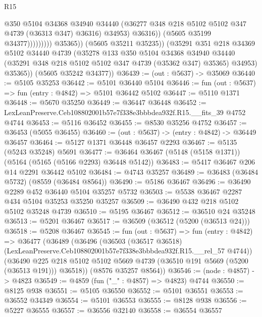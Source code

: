 \begin{lexlean}{R15}
\begin{coremodule}
{{{{{{{{{{{                                    @350
                                    @5104
                                    @34368
                                    @34940
                                    @34440
                                    (@36277 @348 @218 @5102 @5102 @347 @4739 (@36313 @347) @36316)
                                    @34953)
                                  @36316))
                              (@5605 @35199 @34377)))))))))
              @35365))
          (@5605 @35211 @35235))
        (@35291
          @351
          @218
          @34369
          @5102
          @34440
          @4739
          (@35278
            @133
            @350
            @5104
            @34368
            @34940
            @34440
            (@35291 @348 @218 @5102 @5102 @347 @4739 (@35362 @347) @35365)
            @34953)
          @35365))
      (@5605 @35242 @34377))
@36439 := (out : @5637) -> @35069
@36440 := @5105 @35253
@36442 := @5101 @36440 @5104
@36446 := fun (out : @5637) => fun (entry : @4842) => @5101 @36442 @5102
@36447 := @5110 @1371
@36448 := @5670 @35250
@36449 := @36447 @36448
@36452 := LexLeanPreserve.Ceb108802001b57e7f338e3bbbdea932f.R15.__fits_39 @4752 @4744
@36453 := @5116 @36452
@36455 := @8530 @35256 @4752
@36457 := @36453 (@5055 @36455)
@36460 := (out : @5637) -> (entry : @4842) -> @36449 @36457
@36464 := @5127 @1371 @36448 @36457 @2293
@36467 := @5135 (@5243 @35248) @5691
@36477 := @36464 @36467 (@5148 (@5158 @1371)) (@5164 (@5165 (@5166 @2293) @36448 @5142))
@36483 := @5417 @36467 @206 @14 @2291 @36442 @5102
@36484 := @4743 @35257
@36489 := @36483 (@36484 @5732) (@8559 (@36484 @8564))
@36490 := @5186 @36467
@36496 := @36490 @2289 @452 @36440 @5104 @35257 @5732
@36503 := @5538 @36467 @2287 @434 @5104 @35253 @35250 @35257
@36509 := @36490 @432 @218 @5102 @5102 @35248 @4739
@36510 := @5195 @36467
@36512 := @36510 @24 @35248
@36513 := @5201 @36467
@36517 := @36509 (@36512 (@5200 (@36513 @24)))
@36518 := @5208 @36467
@36545 := fun (out : @5637) =>
  fun (entry : @4842) =>
  @36477
    (@36489
      (@36496
        (@36503
          (@36517 @36518)
          (LexLeanPreserve.Ceb108802001b57e7f338e3bbbdea932f.R15.__rel_57 @4744))
        (@36490 @225 @218 @5102 @5102 @5669 @4739 (@36510 @191 @5669 (@5200 (@36513 @191))) @36518))
      (@8576 @35257 @8564))
@36546 := (node : @4857) -> @4823
@36549 := @4859 (fun ("_" : @4857) => @4823) @4744
@36550 := @8125 @938
@36551 := @5105 @36550
@36552 := @5101 @36551
@36553 := @36552 @34349
@36554 := @5101 @36553
@36555 := @8128 @938
@36556 := @5227 @36555
@36557 := @36556 @32140
@36558 := @36554 @36557
}}}}}}}}}}}
\end{coremodule}
\end{lexlean}
